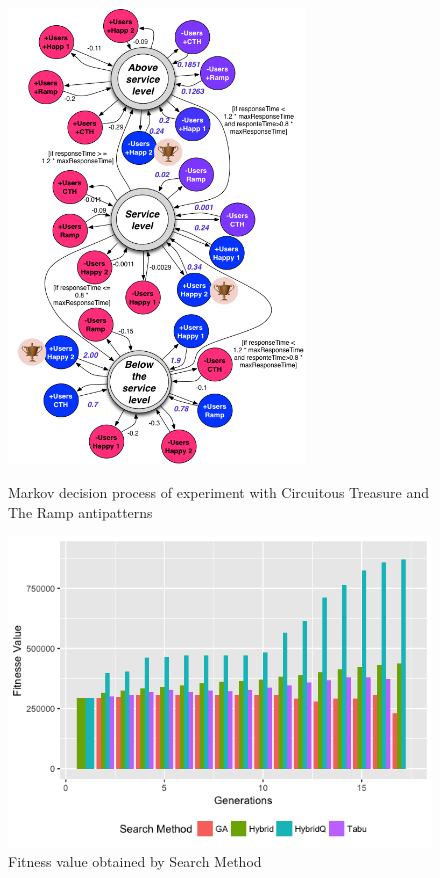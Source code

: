 \begin{figure}[h]
\begin{minipage}{.5\textwidth}
\centering
\includegraphics[width=0.7\textwidth]{./images/mdpexperiment.png}
\caption{Markov decision process of experiment with Circuitous Treasure and The Ramp antipatterns}
\label{fig:mdpexperiment1}
\end{minipage}
\begin{minipage}{.5\textwidth}
\centering
\includegraphics[width=.9\textwidth]{./images/experiment2-7.png}
\caption{Fitness value obtained by Search Method}
\label{fig:fitnessbygeneration2}
\end{minipage}
\end{figure}



